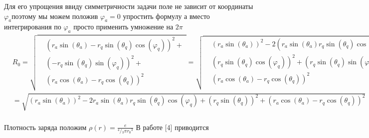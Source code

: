 ﻿\documentclass[12pt]{article}
\begin{document}
Для его упрощения ввиду симметричности задачи поле не зависит от координаты ${{\varphi }_{a}}$поэтому мы можем положив ${{\varphi }_{a}}=0$ упростить формулу а вместо интегрирования по ${{\varphi }_{a}}$ просто применить умножение на $2\pi $ 
$\begin{align}
  & {{R}_{0}}=\sqrt{\begin{align}
  & {{\left( {{r}_{a}}\sin \left( {{\theta }_{a}} \right)-{{r}_{q}}\sin \left( {{\theta }_{q}} \right)\cos \left( {{\varphi }_{q}} \right) \right)}^{2}}+ \\ 
 & {{\left( -{{r}_{q}}\sin \left( {{\theta }_{q}} \right)\sin \left( {{\varphi }_{q}} \right) \right)}^{2}}+ \\ 
 & {{\left( {{r}_{a}}\cos \left( {{\theta }_{a}} \right)-{{r}_{q}}\cos \left( {{\theta }_{q}} \right) \right)}^{2}} \\ 
\end{align}}=\sqrt{\begin{align}
  & {{\left( {{r}_{a}}\sin \left( {{\theta }_{a}} \right) \right)}^{2}}-2\left( {{r}_{a}}\sin \left( {{\theta }_{a}} \right){{r}_{q}}\sin \left( {{\theta }_{q}} \right)\cos \left( {{\varphi }_{q}} \right) \right)+ \\ 
 & {{\left( {{r}_{q}}\sin \left( {{\theta }_{q}} \right)\cos \left( {{\varphi }_{q}} \right) \right)}^{2}}+{{\left( {{r}_{q}}\sin \left( {{\theta }_{q}} \right)\sin \left( {{\varphi }_{q}} \right) \right)}^{2}}+ \\ 
 & {{\left( {{r}_{a}}\cos \left( {{\theta }_{a}} \right)-{{r}_{q}}\cos \left( {{\theta }_{q}} \right) \right)}^{2}} \\ 
\end{align}} \\ 
 & =\sqrt{{{\left( {{r}_{a}}\sin \left( {{\theta }_{a}} \right) \right)}^{2}}-2{{r}_{a}}\sin \left( {{\theta }_{a}} \right){{r}_{q}}\sin \left( {{\theta }_{q}} \right)\cos \left( {{\varphi }_{q}} \right)+{{\left( {{r}_{q}}\sin \left( {{\theta }_{q}} \right) \right)}^{2}}+{{\left( {{r}_{a}}\cos \left( {{\theta }_{a}} \right)-{{r}_{q}}\cos \left( {{\theta }_{q}} \right) \right)}^{2}}} \\ 
\end{align}$

Плотность заряда положим $\rho \left( r \right)=\frac{e}{{}^{4}/{}_{3}\pi {{r}_{0}}^{3}}$ 
В работе [4] приводится 

\end{document}
